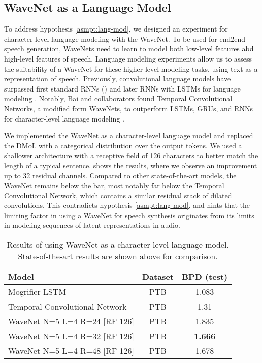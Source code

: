 \subsection{WaveNet as a Language Model}\label{ssec:results-lm}
To address hypothesis \ref{asmpt:lang-mod}, we designed an experiment for character-level language modeling with the WaveNet. 
To be used for end2end speech generation, WaveNets need to learn to model both low-level features abd high-level features of speech. 
Language modeling experiments allow us to assess the suitability of a WaveNet for these higher-level modeling tasks, using text as a representation of speech.
Previously, convolutional language models have surpassed first standard RNNs (\cite{pham_convolutional_2016}) and later RNNs with LSTMs for language modeling
\cite{dauphin_language_2017}.
Notably, Bai and collaborators found Temporal Convolutional Networks, a modified form WaveNets, to outperform LSTMs, GRUs, and RNNs for character-level language modeling
\cite{bai_empirical_2018}.

We implemented the WaveNet as a character-level language model and replaced the DMoL with a categorical distribution over the output tokens. 
We used a shallower architecture with a receptive field of 126 characters to better match the length of a typical sentence. 
 shows the results, where we observe an improvement up to 32 residual channels. 
Compared to other state-of-the-art models, the WaveNet remains below the bar, most notably far below the Temporal Convolutional Network, which contains a similar residual stack of dilated convolutions.
This contradicts hypothesis \ref{asmpt:lang-mod}, and hints that the limiting factor in using a WaveNet for speech synthesis originates from its limits in modeling sequences of latent representations in audio.  

\begin{table}[htb]
    \centering
    \begin{tabular}{l|c||c}
        Model & Dataset & BPD (test) \\
        \hline
        Mogrifier LSTM \cite{melis_mogrifier_2020} & PTB & 1.083 \\
        Temporal Convolutional Network \cite{bai_empirical_2018} & PTB & 1.31 \\
        \hline
        WaveNet N=5 L=4 R=24 [RF 126] & PTB & 1.835 \\
        WaveNet N=5 L=4 R=32 [RF 126] & PTB & \textbf{1.666} \\
        WaveNet N=5 L=4 R=48 [RF 126] & PTB & 1.678 \\
    \end{tabular}
    \caption{
    Results of using WaveNet as a character-level language model. 
    State-of-the-art results are shown above for comparison. 
    }
    \label{tab:wavenet_lm}
\end{table}


